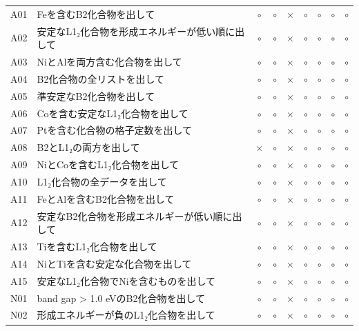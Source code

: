 \documentclass[3p]{elsarticle}
\begin{document}
\begin{longtable}{lp{5cm}ccccccc}
  A01 & Feを含むB2化合物を出して & $\circ$ & $\circ$ & $\times$ & $\circ$ & $\circ$ & $\circ$ & $\circ$ \\
  A02 & 安定なL1₂化合物を形成エネルギーが低い順に出して & $\circ$ & $\circ$ & $\times$ & $\circ$ & $\circ$ & $\circ$ & $\circ$ \\
  A03 & NiとAlを両方含む化合物を出して & $\circ$ & $\circ$ & $\times$ & $\circ$ & $\circ$ & $\circ$ & $\circ$ \\
  A04 & B2化合物の全リストを出して & $\circ$ & $\circ$ & $\times$ & $\circ$ & $\circ$ & $\circ$ & $\circ$ \\
  A05 & 準安定なB2化合物を出して & $\circ$ & $\circ$ & $\times$ & $\circ$ & $\circ$ & $\circ$ & $\circ$ \\
  A06 & Coを含む安定なL1₂化合物を出して & $\circ$ & $\circ$ & $\times$ & $\circ$ & $\circ$ & $\circ$ & $\circ$ \\
  A07 & Ptを含む化合物の格子定数を出して & $\circ$ & $\circ$ & $\times$ & $\circ$ & $\circ$ & $\circ$ & $\circ$ \\
  A08 & B2とL1₂の両方を出して & $\times$ & $\circ$ & $\times$ & $\circ$ & $\circ$ & $\circ$ & $\circ$ \\
  A09 & NiとCoを含むL1₂化合物を出して & $\circ$ & $\circ$ & $\times$ & $\circ$ & $\circ$ & $\circ$ & $\circ$ \\
  A10 & L1₂化合物の全データを出して & $\circ$ & $\circ$ & $\times$ & $\circ$ & $\circ$ & $\circ$ & $\circ$ \\
  A11 & FeとAlを含むB2化合物を出して & $\circ$ & $\circ$ & $\times$ & $\circ$ & $\circ$ & $\circ$ & $\circ$ \\
  A12 & 安定なB2化合物を形成エネルギーが低い順に出して & $\circ$ & $\circ$ & $\times$ & $\circ$ & $\circ$ & $\circ$ & $\circ$ \\
  A13 & Tiを含むL1₂化合物を出して & $\circ$ & $\circ$ & $\times$ & $\circ$ & $\circ$ & $\circ$ & $\circ$ \\
  A14 & NiとTiを含む安定な化合物を出して & $\circ$ & $\circ$ & $\times$ & $\circ$ & $\circ$ & $\circ$ & $\circ$ \\
  A15 & 安定なL1₂化合物でNiを含むものを出して & $\circ$ & $\circ$ & $\times$ & $\circ$ & $\circ$ & $\circ$ & $\circ$ \\
  N01 & band gap > 1.0 eVのB2化合物を出して & $\circ$ & $\circ$ & $\times$ & $\circ$ & $\circ$ & $\circ$ & $\circ$ \\
  N02 & 形成エネルギーが負のL1₂化合物を出して & $\circ$ & $\circ$ & $\times$ & $\circ$ & $\circ$ & $\circ$ & $\circ$ \\

\end{longtable}
\end{document}
